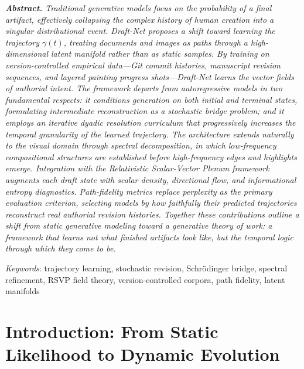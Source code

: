 \documentclass[12pt,a4paper]{article}
\theoremstyle{draftthm}
\newcommand{\traj}{\gamma}
\begin{document}
\begin{titlepage}
\vspace{1.4cm}
\begin{minipage}{0.88\textwidth}
\small\itshape\color{draftgray}
\textbf{Abstract.}\quad
Traditional generative models focus on the probability of a final artifact, effectively collapsing the complex history of human creation into a singular distributional event. Draft-Net proposes a shift toward learning the trajectory $\traj(t)$, treating documents and images as paths through a high-dimensional latent manifold rather than as static samples. By training on version-controlled empirical data---Git commit histories, manuscript revision sequences, and layered painting progress shots---Draft-Net learns the vector fields of authorial intent. The framework departs from autoregressive models in two fundamental respects: it conditions generation on both initial and terminal states, formulating intermediate reconstruction as a stochastic bridge problem; and it employs an iterative dyadic resolution curriculum that progressively increases the temporal granularity of the learned trajectory. The architecture extends naturally to the visual domain through spectral decomposition, in which low-frequency compositional structures are established before high-frequency edges and highlights emerge. Integration with the Relativistic Scalar-Vector Plenum framework augments each draft state with scalar density, directional flow, and informational entropy diagnostics. Path-fidelity metrics replace perplexity as the primary evaluation criterion, selecting models by how faithfully their predicted trajectories reconstruct real authorial revision histories. Together these contributions outline a shift from static generative modeling toward a generative theory of work: a framework that learns not what finished artifacts look like, but the temporal logic through which they come to be.
\end{minipage}

\vspace{1.0cm}
{\small\color{draftgray}
\textit{Keywords}: trajectory learning, stochastic revision, Schrödinger bridge, spectral refinement,
RSVP field theory, version-controlled corpora, path fidelity, latent manifolds}
\end{titlepage}

\tableofcontents
\newpage

\section{Introduction: From Static Likelihood to Dynamic Evolution}
\end{document}

